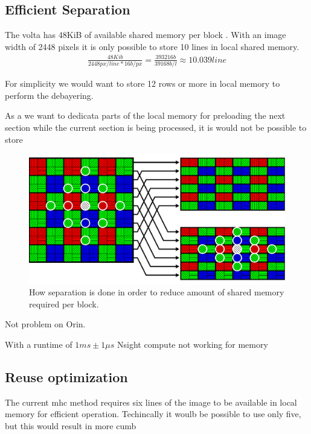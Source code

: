 \subsection{Efficient Separation}
The \gls{volta} has 48KiB of available shared memory per block \cite{rigerunNVIDIAJetsonXavier2023}.
With an image width of 2448 pixels \cite{lucidvisionlabsTriton0MPPolarization} it is only possible to store 10 lines in local shared memory.
\begin{align}
    \frac{48Kib}{2448px/line * 16b/px} = \frac{393216b}{39168b/l} \approx 10.039line
\end{align}

For simplicity we would want to store 12 rows or more in local memory to perform the debayering.


As a we want to dedicata parts of the local memory for preloading the next section while the current section is being processed, it is would not be possible to store
\begin{figure}[H]
    \centering
    \includegraphics[width=\textwidth]{figures/polarized_image/separation.pdf}
    \caption{How separation is done in order to reduce amount of shared memory required per block.}
    \label{fig:saperation}
\end{figure}
Not problem on Orin.







With a runtime of $1 ms \pm 1 \mu s$
Nsight compute not working for memory











\subsection{Reuse optimization}
The current \gls{mhc} method requires six lines of the image to be available in local memory for efficient operation.
Techincally it woulb be possible to use only five, but this would result in more cumb

